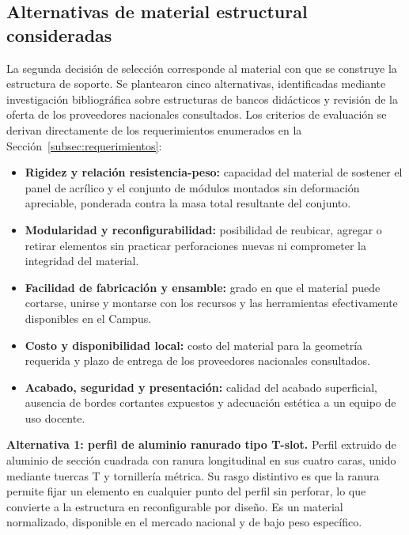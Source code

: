 \documentclass[12pt,a4paper,oneside]{report}
\begin{document}
\subsection{Alternativas de material estructural consideradas}

La segunda decisión de selección corresponde al material con que se construye la estructura de soporte. Se plantearon cinco alternativas, identificadas mediante investigación bibliográfica sobre estructuras de bancos didácticos y revisión de la oferta de los proveedores nacionales consultados. Los criterios de evaluación se derivan directamente de los requerimientos enumerados en la Sección~\ref{subsec:requerimientos}:

\begin{itemize}
    \item \textbf{Rigidez y relación resistencia-peso:} capacidad del material de sostener el panel de acrílico y el conjunto de módulos montados sin deformación apreciable, ponderada contra la masa total resultante del conjunto.
    \item \textbf{Modularidad y reconfigurabilidad:} posibilidad de reubicar, agregar o retirar elementos sin practicar perforaciones nuevas ni comprometer la integridad del material.
    \item \textbf{Facilidad de fabricación y ensamble:} grado en que el material puede cortarse, unirse y montarse con los recursos y las herramientas efectivamente disponibles en el Campus.
    \item \textbf{Costo y disponibilidad local:} costo del material para la geometría requerida y plazo de entrega de los proveedores nacionales consultados.
    \item \textbf{Acabado, seguridad y presentación:} calidad del acabado superficial, ausencia de bordes cortantes expuestos y adecuación estética a un equipo de uso docente.
\end{itemize}

\textbf{Alternativa 1: perfil de aluminio ranurado tipo T-slot.} Perfil extruido de aluminio de sección cuadrada con ranura longitudinal en sus cuatro caras, unido mediante tuercas T y tornillería métrica. Su rasgo distintivo es que la ranura permite fijar un elemento en cualquier punto del perfil sin perforar, lo que convierte a la estructura en reconfigurable por diseño. Es un material normalizado, disponible en el mercado nacional y de bajo peso específico.
\end{document}
